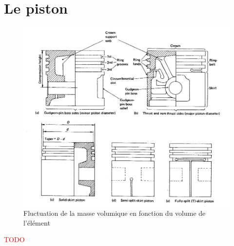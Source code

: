 \section{Le piston}
\begin{figure}[H]
    \centering
    \includegraphics[width = 15cm]{Images/ImagesICE/PistonNomenclature.png}
    \caption{Fluctuation de la masse volumique en fonction du volume de l'élément \protect \footnotemark}
    \label{fig:fluctuationsVER}
\end{figure}

\textcolor{red}{TODO}